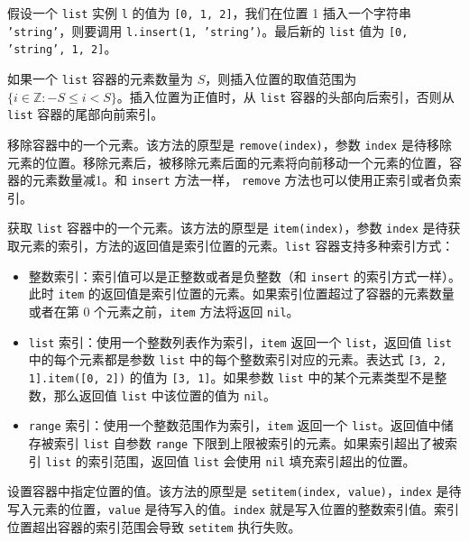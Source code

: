 假设一个 \texttt{list} 实例 \texttt{l} 的值为 \texttt{[0, 1, 2]}，我们在位置 1 插入一个字符串 \texttt{'string'}，则要调用 \texttt{l.insert(1, 'string')}。最后新的 \texttt{list} 值为 \texttt{[0, 'string', 1, 2]}。

如果一个 \texttt{list} 容器的元素数量为 $S$，则插入位置的取值范围为 $\{i \in \mathbb{Z}: -S\leqslant i<S\}$。插入位置为正值时，从 \texttt{list} 容器的头部向后索引，否则从 \texttt{list} 容器的尾部向前索引。


移除容器中的一个元素。该方法的原型是 \texttt{remove(index)}，参数 \texttt{index} 是待移除元素的位置。移除元素后，被移除元素后面的元素将向前移动一个元素的位置，容器的元素数量减1。和 \texttt{insert} 方法一样， \texttt{remove} 方法也可以使用正索引或者负索引。


获取 \texttt{list} 容器中的一个元素。该方法的原型是 \texttt{item(index)}，参数 \texttt{index} 是待获取元素的索引，方法的返回值是索引位置的元素。\texttt{list} 容器支持多种索引方式：

\begin{itemize}
    \item 整数索引：索引值可以是正整数或者是负整数（和 \texttt{insert} 的索引方式一样）。此时 \texttt{item} 的返回值是索引位置的元素。如果索引位置超过了容器的元素数量或者在第 0 个元素之前，\texttt{item} 方法将返回 \texttt{nil}。
    \item \texttt{list} 索引：使用一个整数列表作为索引，\texttt{item} 返回一个 \texttt{list}，返回值 \texttt{list} 中的每个元素都是参数 \texttt{list} 中的每个整数索引对应的元素。表达式 \texttt{[3, 2, 1].item([0, 2])} 的值为 \texttt{[3, 1]}。如果参数 \texttt{list} 中的某个元素类型不是整数，那么返回值 \texttt{list} 中该位置的值为 \texttt{nil}。
    \item \texttt{range} 索引：使用一个整数范围作为索引，\texttt{item} 返回一个 \texttt{list}。返回值中储存被索引 \texttt{list} 自参数 \texttt{range} 下限到上限被索引的元素。如果索引超出了被索引 \texttt{list} 的索引范围，返回值 \texttt{list} 会使用 \texttt{nil} 填充索引超出的位置。
\end{itemize}


设置容器中指定位置的值。该方法的原型是 \texttt{setitem(index, value)}，\texttt{index} 是待写入元素的位置，\texttt{value} 是待写入的值。\texttt{index} 就是写入位置的整数索引值。索引位置超出容器的索引范围会导致 \texttt{setitem} 执行失败。

